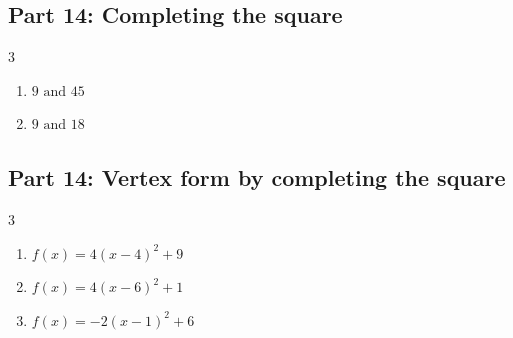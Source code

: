 \documentclass[11pt]{article}
\begin{document}
\subsection*{Part 14: Completing the square}
\begin{multicols}{3}
\begin{enumerate}
  \item $9 \text{ and } 45$
  \item $9 \text{ and } 18$
\end{enumerate}
\end{multicols}
\subsection*{Part 14: Vertex form by completing the square}
\begin{multicols}{3}
\begin{enumerate}
  \item $f(x) = 4(x - 4)^{2} + 9$
  \item $f(x) = 4(x - 6)^{2} + 1$
  \item $f(x) = -2(x - 1)^{2} + 6$
\end{enumerate}
\end{multicols}
\end{document}
